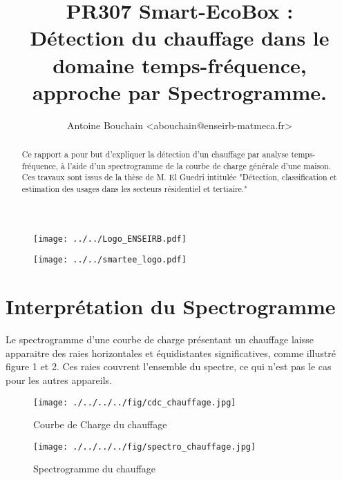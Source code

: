 \documentclass[10pt,a4paper]{article}
\title{PR307 Smart-EcoBox : \\
Détection du chauffage dans le domaine temps-fréquence, approche par Spectrogramme.}
\author{Antoine Bouchain <abouchain@enseirb-matmeca.fr> \\}
\begin{document}
\maketitle

\begin{figure}[ht]
\begin{center}
\noindent \texttt{[image: ../../Logo\_ENSEIRB.pdf]}
\end{center}
\end{figure}
\begin{figure}[ht]
\begin{center}
\noindent \texttt{[image: ../../smartee\_logo.pdf]}
\end{center}
\end{figure}


\newpage

\tableofcontents

\newpage
\begin{abstract}
Ce rapport a pour but d'expliquer la détection d'un chauffage par analyse temps-fréquence, à l'aide d'un spectrogramme de la courbe de charge générale d'une maison. Ces travaux sont issus de la thèse de M. El Guedri intitulée "Détection, classification et estimation des usages dans les secteurs résidentiel et tertiaire." 
\end{abstract}

\section{Interprétation du Spectrogramme}
Le spectrogramme d'une courbe de charge présentant un chauffage laisse apparaitre des raies horizontales et équidistantes significatives, comme illustré figure 1 et 2. Ces raies couvrent l'ensemble du spectre, ce qui n'est pas le cas pour les autres appareils.

\begin{figure}[!h]
\begin{center}
\texttt{[image: ./../../../fig/cdc\_chauffage.jpg]}
\caption{Courbe de Charge du chauffage}
\label{Figure}
\end{center}
\end{figure}

\begin{figure}[!h]
\begin{center}
\texttt{[image: ./../../../fig/spectro\_chauffage.jpg]}
\caption{Spectrogramme du chauffage}
\label{Figure}
\end{center}
\end{figure}
\end{document}
